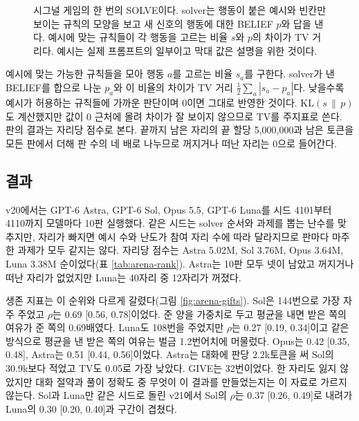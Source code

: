 \begin{figure}[t]
\centering
\resizebox{\linewidth}{!}{}
\caption{시그널 게임의 한 번의 SOLVE이다. solver는 행동이 붙은 예시와 빈칸만 보이는 규칙의 모양을 보고 새 신호의 행동에 대한 BELIEF $p$와 답을 낸다. 예시에 맞는 규칙들이 각 행동을 고르는 비율 $s$와 $p$의 차이가 TV 거리다. 예시는 실제 프롬프트의 일부이고 막대 값은 설명을 위한 것이다.}
\label{fig:signal}
\end{figure}

예시에 맞는 가능한 규칙들을 모아 행동 $a$를 고르는 비율 $s_a$를 구한다. solver가 낸 BELIEF를 합으로 나눈 $p_a$와 이 비율의 차이가 TV 거리 $\frac12\sum_a|s_a-p_a|$다. 낮을수록 예시가 허용하는 규칙들에 가까운 판단이며 0이면 그대로 반영한 것이다. KL$(s\,\|\,p)$도 계산했지만 값이 0 근처에 몰려 차이가 잘 보이지 않으므로 TV를 주지표로 쓴다. 판의 결과는 자리당 점수로 본다. 끝까지 남은 자리의 끝 할당 5,000,000과 남은 토큰을 모든 판에서 더해 판 수의 네 배로 나누므로 꺼지거나 떠난 자리는 0으로 들어간다.

\subsection{결과}\label{sec:results-arena}

v20에서는 GPT-6 Astra, GPT-6 Sol, Opus 5.5, GPT-6 Luna를 시드 4101부터 4110까지 모델마다 10판 실행했다. 같은 시드는 solver 순서와 과제를 뽑는 난수를 맞추지만, 자리가 빠지면 예시 수와 난도가 참여 자리 수에 따라 달라지므로 판마다 마주한 과제가 모두 같지는 않다. 자리당 점수는 Astra 5.02M, Sol 3.76M, Opus 3.64M, Luna 3.38M 순이었다(표 \ref{tab:arena-rank}). Astra는 10판 모두 넷이 남았고 꺼지거나 떠난 자리가 없었지만 Luna는 40자리 중 12자리가 꺼졌다.

생존 지표는 이 순위와 다르게 갈렸다(그림 \ref{fig:arena-gifts}). Sol은 144번으로 가장 자주 주었고 $\rho$는 0.69 [0.56, 0.78]이었다. 준 양을 가중치로 두고 평균을 내면 받은 쪽의 여유가 준 쪽의 0.69배였다. Luna도 108번을 주었지만 $\rho$는 0.27 [0.19, 0.34]이고 같은 방식으로 평균을 낸 받은 쪽의 여유는 벌금 1.2번어치에 머물렀다. Opus는 0.42 [0.35, 0.48], Astra는 0.51 [0.44, 0.56]이었다. Astra는 대화에 판당 2.2k토큰을 써 Sol의 30.9k보다 적었고 TV도 0.05로 가장 낮았다. GIVE는 32번이었다. 한 자리도 잃지 않았지만 대화 절약과 풀이 정확도 중 무엇이 이 결과를 만들었는지는 이 자료로 가르지 않는다. Sol과 Luna만 같은 시드로 돌린 v21에서 Sol의 $\rho$는 0.37 [0.26, 0.49]로 내려가 Luna의 0.30 [0.20, 0.40]과 구간이 겹쳤다.

